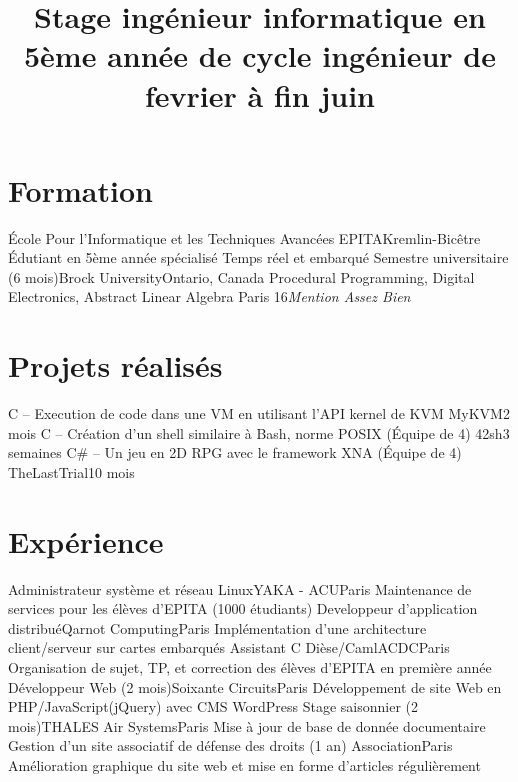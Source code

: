 \documentclass[10pt,a4paper,sans]{moderncv}
\title{Stage ingénieur informatique\newline{} en 5ème année de cycle ingénieur\newline{} de fevrier à fin juin}
\begin{document}
\makecvtitle

\vspace{-1.5\baselineskip}

\section{Formation}
    {École Pour l'Informatique et les Techniques Avancées}
    {EPITA}{Kremlin-Bicêtre}{}
    {Édutiant en 5ème année spécialisé Temps réel et embarqué}
    {Semestre universitaire (6 mois)}{Brock University}{Ontario, Canada}{}
    {Procedural Programming, Digital Electronics, Abstract Linear Algebra}
    {Paris 16}{\textit{Mention Assez Bien}}{}

\section{Projets réalisés}
    {C -- Execution de code dans une VM en utilisant l'API kernel de KVM}
    {MyKVM}{2 mois}{}{}
    {C -- Création d'un shell similaire à Bash, norme POSIX (Équipe de 4)}
    {42sh}{3 semaines}{}{}
    {C\# -- Un jeu en 2D RPG avec le framework XNA (Équipe de 4)}
    {TheLastTrial}{10 mois}{}{}

\section{Expérience}
    {Administrateur système et réseau Linux}{YAKA - ACU}{Paris}{}
    {Maintenance de services pour les élèves d'EPITA (1000 étudiants)}
    {Developpeur d'application distribué}{Qarnot Computing}{Paris}{}
    {Implémentation d'une architecture client/serveur sur cartes embarqués}
    {Assistant C Dièse/Caml}{ACDC}{Paris}{}
    {Organisation de sujet, TP, et correction des élèves d'EPITA en première année}
    {Développeur Web (2 mois)}{Soixante Circuits}{Paris}{}
    {Développement de site Web en PHP/JavaScript(jQuery) avec CMS WordPress}
    {Stage saisonnier (2 mois)}{THALES Air Systems}{Paris}{}
    {Mise à jour de base de donnée documentaire}
    {Gestion d'un site associatif de défense des droits (1 an)}
    {Association}{Paris}{}
    {Amélioration graphique du site web et mise en forme d'articles régulièrement}
\end{document}

